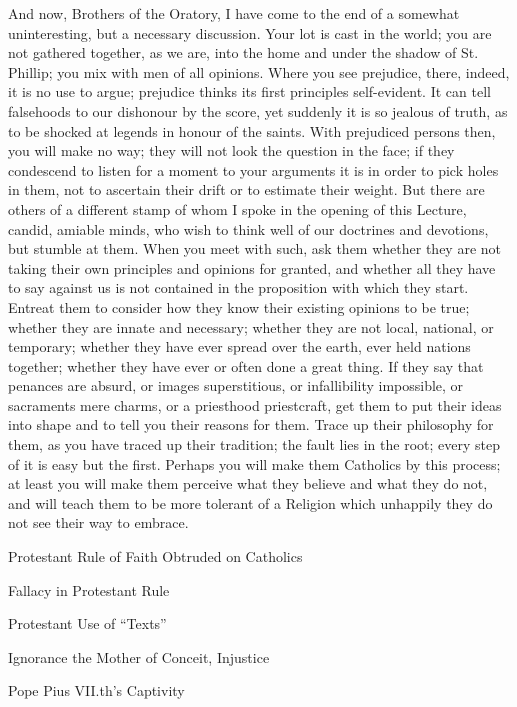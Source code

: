 And now, Brothers of the Oratory, I have come to the
end of a somewhat uninteresting, but a necessary
discussion. Your lot is cast in the world; you are not
gathered together, as we are, into the home and under the
shadow of St. Phillip; you mix with men of all opinions.
Where you see prejudice, there, indeed, it is no use to
argue; prejudice thinks its first principles
self-evident. It can tell falsehoods to our dishonour by
the score, yet suddenly it is so jealous of truth, as to
be shocked at legends in honour of the saints. With
prejudiced persons then, you will make no way; they will
not look the question in the face; if they condescend to
listen for a moment to your arguments it is in order to
pick holes in them, not to ascertain their drift or to
estimate their weight. But there are others of a
different stamp of whom I spoke in the opening of this
Lecture, candid, amiable minds, who wish to think well of
our doctrines and devotions, but stumble at them. When
you meet with such, ask them whether they are not taking
their own principles and opinions for granted, and
whether all they have to say against us is not contained
in the proposition with which they start. Entreat them to
consider how they know their existing opinions to be
true; whether they are innate and necessary; whether they
are not local, national, or temporary; whether they have
ever spread over the earth, ever held nations together;
whether they have ever or often done a great thing. If
they say that penances are absurd, or images
superstitious, or infallibility impossible, or sacraments
mere charms, or a priesthood priestcraft, get them to put
their ideas into shape and to tell you their reasons for
them. Trace up their philosophy for them, as you have
traced up their tradition; the fault lies in the root;
every step of it is easy but the first. Perhaps you will
make them Catholics by this process; at least you will
make them perceive what they believe and what they do
not, and will teach them to be more tolerant of a
Religion which unhappily they do not see their way to
embrace.


Protestant Rule of
Faith Obtruded on Catholics

Fallacy in Protestant Rule

Protestant Use of
``Texts''

Ignorance the Mother of
Conceit, Injustice

Pope Pius VII.th's Captivity

